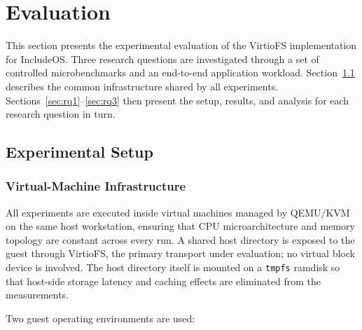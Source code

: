 
\section{Evaluation}
\label{sec:evaluation}

This section presents the experimental evaluation of the VirtioFS
implementation for IncludeOS.  Three research questions are investigated
through a set of controlled microbenchmarks and an end-to-end application
workload.  Section~\ref{sec:setup} describes the common infrastructure
shared by all experiments.  Sections~\ref{sec:rq1}–\ref{sec:rq3} then
present the setup, results, and analysis for each research question in
turn.

\subsection{Experimental Setup}
\label{sec:setup}

\subsubsection{Virtual-Machine Infrastructure}

All experiments are executed inside virtual machines managed by QEMU/KVM
on the same host workstation, ensuring that CPU microarchitecture and
memory topology are constant across every run.  A shared host directory
is exposed to the guest through VirtioFS, the primary transport under
evaluation; no virtual block device is involved.  The host directory
itself is mounted on a \texttt{tmpfs} ramdisk so that host-side storage
latency and caching effects are eliminated from the measurements.

Two guest operating environments are used:

